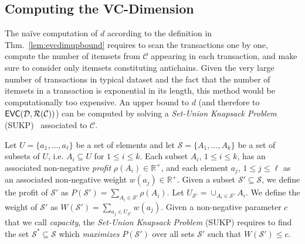 \subsection{Computing the VC-Dimension}
The na\"ive computation of $d$  according to the definition in Thm.~\ref{lem:evcdimupbound}
requires to scan the transactions one by one, 
compute the number of itemsets from $\mathcal{C}$ appearing in each
transaction, and make sure to consider only itemsets constituting antichains. Given the very large
number of transactions in typical dataset and the fact that the number of
itemsets in a transaction is exponential in its length, this method would be
computationally too expensive. An upper bound to $d$ (and therefore to
$\mathsf{EVC}({\cal D},\mathcal{R}(\mathcal{C}))$) can be computed by solving a
\emph{Set-Union Knapsack Problem} (SUKP)~\citep{GoldschmidtNY94} associated to
$\mathcal{C}$.

\begin{definition}\label{def:sukp}
  Let $U=\{a_1,\dotsc,a_\ell\}$ be a set of elements and let
  $\mathcal{S}=\{A_1,\dotsc,A_k\}$ be a set of subsets of $U$, i.e.
  $A_i\subseteq U$ for $1\le i\le k$. Each subset $A_i$, $1\le i\le k$, has an associated
  non-negative \emph{profit} $\rho(A_i)\in\mathbb{R}^+$, and each element $a_j$, $1\le
  j\le\ell$ as an associated non-negative weight $w(a_j)\in\mathbb{R}^+$.
  Given a subset $\mathcal{S}'\subseteq\mathcal{S}$, we define the profit of
  $\mathcal{S}'$ as $P(\mathcal{S}')=\sum_{A_i\in \mathcal{S}'}\rho(A_i)$. Let
  $U_{\mathcal{S}'}=\cup_{A_i\in\mathcal{S}'} A_i$. We
  define the weight of $\mathcal{S}'$ as $W(\mathcal{S}')=\sum_{a_j\in
  U_{\mathcal{S}'}} w(a_j)$. Given a non-negative parameter $c$ that we call
  \emph{capacity}, the \emph{Set-Union Knapsack Problem} (SUKP) requires to find
  the set $\mathcal{S}^*\subseteq\mathcal{S}$ which \emph{maximizes}
  $P(\mathcal{S}')$ over all sets $\mathcal{S}'$ such that $W(\mathcal{S}')\le c$.
\end{definition}

